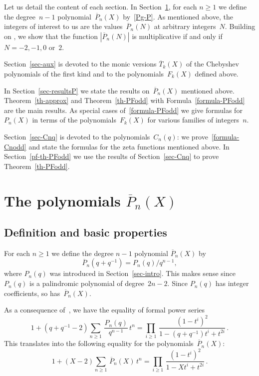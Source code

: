 \documentclass[11pt, a4paper]{amsart}
\theoremstyle{definition}
\newcommand\Pg{\overline{P}}
\newcommand\TT{\overline{T}}
\numberwithin{equation}{section}
\begin{document}
Let us detail the content of each section.
In Section~\ref{sec-Pn}, for each $n\geq 1$ we define the degree~$n-1$ polynomial~$\Pg_n(X)$ by~\eqref{Pg-P}.
As mentioned above, the integers of interest to us are the values~$\Pg_n(N)$ at arbitrary integers~$N$.
Building on \cite{KR3}, we show that the function $|\Pg_n(N)|$ is multiplicative if and only if $N= -2, -1, 0$ or~$2$.

Section~\ref{sec-aux} is devoted to the monic versions $\TT_k(X)$ of the Chebyshev polynomials of the first kind
and to the polynomials~$F_k(X)$ defined above.

In Section~\ref{sec-resultsP} we state the results on~$\Pg_n(X)$ mentioned above.
Theorem~\ref{th-approx} and Theorem~\ref{th-PFodd} with Formula~\eqref{formula-PFodd} are the main results.
As special cases of~\eqref{formula-PFodd} we give formulas for~$P_n(X)$ in terms of the polynomials~$F_k(X)$ 
for various families of integers~$n$.

Section~\ref{sec-Cnq} is devoted to the polynomials~$C_n(q)$:
we prove~\eqref{formula-Cnodd} and state the formulas for the zeta functions mentioned above.
In Section~\ref{pf-th-PFodd} we use the results of Section~\ref{sec-Cnq} to prove Theorem~\ref{th-PFodd}.

\section{The polynomials $\Pg_n(X)$}\label{sec-Pn}


\subsection{Definition and basic properties}\label{ssec-defPn}

For each $n \geq 1$ we define the degree $n-1$ polynomial $\Pg_n(X)$ by
\begin{equation}\label{def-Pgn}
\Pg_n(q + q^{-1}) = P_n(q)/q^{n-1} ,
\end{equation}
where $P_n(q)$ was introduced in Section~\ref{sec-intro}. 
This makes sense since $P_n(q)$ is a palindromic polynomial of degree~$2n-2$. 
Since $P_n(q)$ has integer coefficients, so has~$\Pg_n(X)$.

As a consequence of~\cite[Cor.~1.4]{KR2}, we have the equality of formal power series
\begin{equation*}\label{gf-Pnq}
1 + (q + q^{-1} - 2) \sum_{n\geq 1} \, \frac{P_n(q)}{q^{n-1}}  \, t^n
= \prod_{i\geq 1}\, \frac{(1-t^i)^2}{1-(q+q^{-1})t^i + t^{2i}} \, .
\end{equation*}
This translates into the following equality for the polynomials~$\Pg_n (X)$:
\begin{equation}\label{gf-Pgn}
1 + (X - 2) \sum_{n\geq 1} \, \Pg_n (X)  \, t^n
= \prod_{i\geq 1}\, \frac{(1-t^i)^2}{1- X t^i + t^{2i}} \, .
\end{equation}
\end{document}

